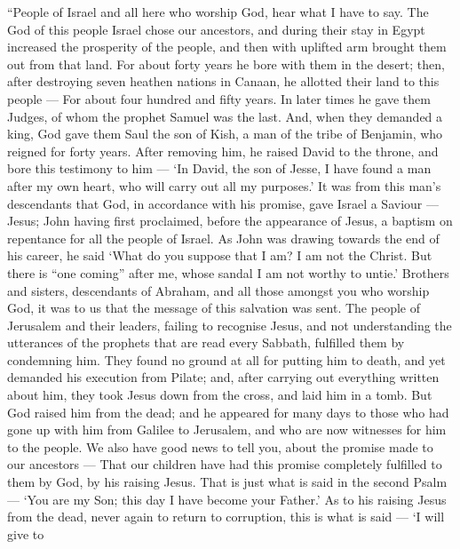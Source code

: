 ``People of Israel and all here who worship God, hear what I have to
say.  The God of this people Israel chose our ancestors,
and during their stay in Egypt increased the prosperity of the people,
and then with uplifted arm brought them out from that land.
 For about forty years he bore with them in the desert;
 then, after destroying seven heathen nations in Canaan, he
allotted their land to this people ---  For about four
hundred and fifty years. In later times he gave them Judges, of whom the
prophet Samuel was the last.  And, when they demanded a
king, God gave them Saul the son of Kish, a man of the tribe of
Benjamin, who reigned for forty years.  After removing him,
he raised David to the throne, and bore this testimony to him --- `In
David, the son of Jesse, I have found a man after my own heart, who will
carry out all my purposes.'  It was from this man's
descendants that God, in accordance with his promise, gave Israel a
Saviour --- Jesus;  John having first proclaimed, before
the appearance of Jesus, a baptism on repentance for all the people of
Israel.  As John was drawing towards the end of his career,
he said `What do you suppose that I am? I am not the Christ. But there
is ``one coming'' after me, whose sandal I am not worthy to untie.'
 Brothers and sisters, descendants of Abraham, and all
those amongst you who worship God, it was to us that the message of this
salvation was sent.  The people of Jerusalem and their
leaders, failing to recognise Jesus, and not understanding the
utterances of the prophets that are read every Sabbath, fulfilled them
by condemning him.  They found no ground at all for putting
him to death, and yet demanded his execution from Pilate; 
and, after carrying out everything written about him, they took Jesus
down from the cross, and laid him in a tomb.  But God
raised him from the dead;  and he appeared for many days to
those who had gone up with him from Galilee to Jerusalem, and who are
now witnesses for him to the people.  We also have good
news to tell you, about the promise made to our ancestors ---
 That our children have had this promise completely
fulfilled to them by God, by his raising Jesus. That is just what is
said in the second Psalm --- `You are my Son; this day I have become
your Father.'  As to his raising Jesus from the dead, never
again to return to corruption, this is what is said --- `I will give to
